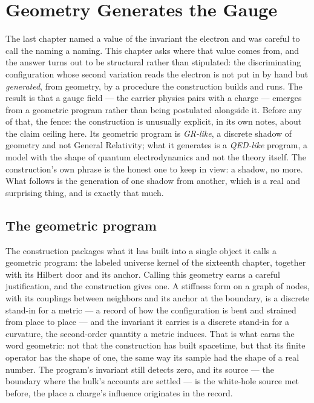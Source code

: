 \chapter{Geometry Generates the Gauge}
\label{chap:geometry-generates-gauge}

The last chapter named a value of the invariant the electron and was careful to call the naming a
naming. This chapter asks where that value comes from, and the answer turns out to be structural rather
than stipulated: the discriminating configuration whose second variation reads the electron is not put
in by hand but \emph{generated}, from geometry, by a procedure the construction builds and runs. The
result is that a gauge field --- the carrier physics pairs with a charge --- emerges from a geometric
program rather than being postulated alongside it. Before any of that, the fence: the construction is
unusually explicit, in its own notes, about the claim ceiling here. Its geometric program is
\emph{GR-like}, a discrete shadow of geometry and not General Relativity; what it generates is a
\emph{QED-like} program, a model with the shape of quantum electrodynamics and not the theory itself.
The construction's own phrase is the honest one to keep in view: a shadow, no more. What follows is the
generation of one shadow from another, which is a real and surprising thing, and is exactly that much.

\section{The geometric program}
\label{se:the-geometric-program}

The construction packages what it has built into a single object it calls a geometric program: the
labeled universe kernel of the sixteenth chapter, together with its Hilbert door and its anchor. Calling
this geometry earns a careful justification, and the construction gives one. A stiffness form on a graph
of nodes, with its couplings between neighbors and its anchor at the boundary, is a discrete stand-in
for a metric --- a record of how the configuration is bent and strained from place to place --- and the
invariant it carries is a discrete stand-in for a curvature, the second-order quantity a metric induces.
That is what earns the word geometric: not that the construction has built spacetime, but that its
finite operator has the shape of one, the same way its sample had the shape of a real number. The
program's invariant still detects zero, and its source --- the boundary where the bulk's accounts are
settled --- is the white-hole source met before, the place a charge's influence originates in the
record.

